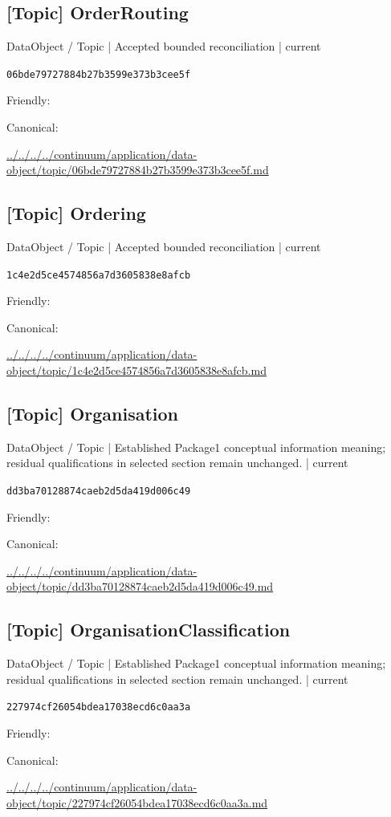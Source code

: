 \documentclass[10pt,a4paper]{article}
\begin{document}
\subsection*{[Topic] OrderRouting}
{\small DataObject / Topic | Accepted bounded reconciliation | current}\par
\texttt{06bde79727884b27b3599e373b3cee5f}\par
Friendly: \par
Canonical: \par
{\footnotesize\url{../../../../continuum/application/data-object/topic/06bde79727884b27b3599e373b3cee5f.md}}\par
\subsection*{[Topic] Ordering}
{\small DataObject / Topic | Accepted bounded reconciliation | current}\par
\texttt{1c4e2d5ce4574856a7d3605838e8afcb}\par
Friendly: \par
Canonical: \par
{\footnotesize\url{../../../../continuum/application/data-object/topic/1c4e2d5ce4574856a7d3605838e8afcb.md}}\par
\subsection*{[Topic] Organisation}
{\small DataObject / Topic | Established Package1 conceptual information meaning; residual qualifications in selected section remain unchanged. | current}\par
\texttt{dd3ba70128874caeb2d5da419d006c49}\par
Friendly: \par
Canonical: \par
{\footnotesize\url{../../../../continuum/application/data-object/topic/dd3ba70128874caeb2d5da419d006c49.md}}\par
\subsection*{[Topic] OrganisationClassification}
{\small DataObject / Topic | Established Package1 conceptual information meaning; residual qualifications in selected section remain unchanged. | current}\par
\texttt{227974cf26054bdea17038ecd6c0aa3a}\par
Friendly: \par
Canonical: \par
{\footnotesize\url{../../../../continuum/application/data-object/topic/227974cf26054bdea17038ecd6c0aa3a.md}}\par
\end{document}
